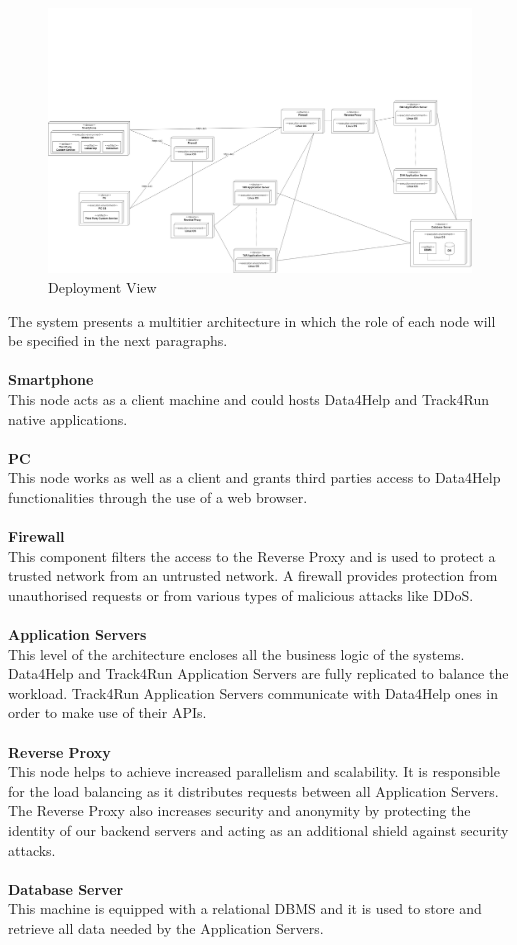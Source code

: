 \documentclass[titlepage]{article}
\begin{document}
\begin{figure}[H]
	\center
  	\includegraphics[width=15cm]{Deployment.png}
  	\caption{Deployment View}
 	\label{fig:DEPVIEW}
\end{figure}
The system presents a multitier architecture in which the role of each node will be specified in the next paragraphs. \\ \\
{\bf Smartphone }\\ 
This node acts as a client machine and could hosts Data4Help and Track4Run native applications. \\ \\
{\bf PC }\\ 
This node works as well as a client and grants third parties access to Data4Help functionalities through the use of a web browser.\\ \\
{\bf Firewall }\\ 
This component filters the access to the Reverse Proxy and is used to protect a trusted network from an untrusted network. A firewall provides protection from unauthorised requests or from various types of malicious attacks like DDoS.\\ \\
{\bf Application Servers }\\ 
This level of the architecture encloses all the business logic of the systems. Data4Help and Track4Run Application Servers are fully replicated to balance the workload. Track4Run Application Servers communicate with Data4Help ones in order to make use of their APIs.\\ \\
{\bf Reverse Proxy }\\ 
This node helps to achieve increased parallelism and scalability. It is responsible for the load balancing as it distributes requests between all Application Servers. The Reverse Proxy also increases security and anonymity by protecting the identity of our backend servers and acting as an additional shield against security attacks.\\ \\
{\bf Database Server }\\ 
This machine is equipped with a relational DBMS and it is used to store and retrieve all data needed by the Application Servers. 
\end{document}
